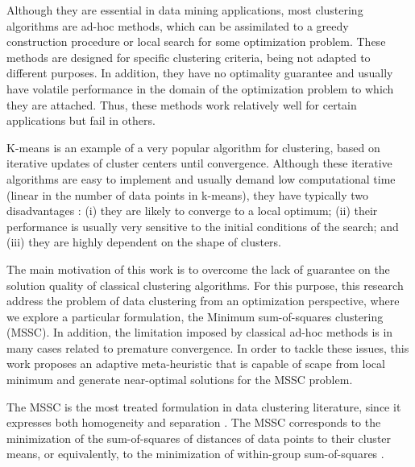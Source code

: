Although they are essential in data mining applications, most clustering algorithms are ad-hoc methods, which can be assimilated to a greedy construction procedure or local search for some optimization problem. These methods are designed for specific clustering criteria, being not adapted to different purposes. In addition, they have no optimality guarantee and usually have volatile performance in the domain of the optimization problem to which they are attached. Thus, these methods work relatively well for certain applications but fail in others.

K-means is an example of a very popular algorithm for clustering, based on iterative updates of cluster centers until convergence. Although these iterative algorithms are easy to implement and usually demand low computational time (linear in the number of data points in k-means), they have typically two disadvantages \cite{Das2009}: (i) they are likely to converge to a local optimum; (ii) their performance is usually very sensitive to the initial conditions of the search; and (iii) they are highly dependent on the shape of clusters.

The main motivation of this work is to overcome the lack of guarantee on the solution quality of classical clustering algorithms. For this purpose, this research address the problem of data clustering from an optimization perspective, where we explore a particular formulation, the Minimum sum-of-squares clustering (MSSC). In addition, the limitation imposed by classical ad-hoc methods is in many cases related to premature convergence. In order to tackle these issues, this work proposes an adaptive meta-heuristic that is capable of scape from local minimum and generate near-optimal solutions for the MSSC problem.

The MSSC is the most treated formulation in data clustering literature, since it expresses both homogeneity and separation \cite{Hansen2009}. The MSSC corresponds to the minimization of the sum-of-squares of distances of data points to their cluster means, or equivalently, to the minimization of within-group sum-of-squares \cite{Xavier2011}.


